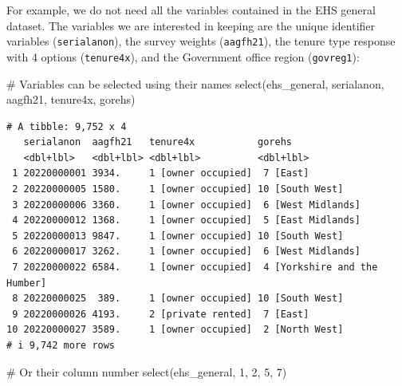 \documentclass[
  letterpaper,
  DIV=11,
  numbers=noendperiod]{scrreprt}
\newenvironment{Shaded}{\begin{snugshade}}{\end{snugshade}}
\newcommand{\CommentTok}[1]{\textcolor[rgb]{0.37,0.37,0.37}{#1}}
\newcommand{\DecValTok}[1]{\textcolor[rgb]{0.68,0.00,0.00}{#1}}
\newcommand{\FunctionTok}[1]{\textcolor[rgb]{0.28,0.35,0.67}{#1}}
\newcommand{\NormalTok}[1]{\textcolor[rgb]{0.00,0.23,0.31}{#1}}
\begin{document}
For example, we do not need all the variables contained in the EHS
general dataset. The variables we are interested in keeping are the
unique identifier variables (\texttt{serialanon}), the survey weights
(\texttt{aagfh21}), the tenure type response with 4 options
(\texttt{tenure4x}), and the Government office region
(\texttt{govreg1}):

\begin{Shaded}
\begin{Highlighting}[]
\CommentTok{\# Variables can be selected using their names}
\FunctionTok{select}\NormalTok{(ehs\_general, serialanon, aagfh21, tenure4x, gorehs)}
\end{Highlighting}
\end{Shaded}

\begin{verbatim}
# A tibble: 9,752 x 4
   serialanon  aagfh21   tenure4x           gorehs                       
   <dbl+lbl>   <dbl+lbl> <dbl+lbl>          <dbl+lbl>                    
 1 20220000001 3934.     1 [owner occupied]  7 [East]                    
 2 20220000005 1580.     1 [owner occupied] 10 [South West]              
 3 20220000006 3360.     1 [owner occupied]  6 [West Midlands]           
 4 20220000012 1368.     1 [owner occupied]  5 [East Midlands]           
 5 20220000013 9847.     1 [owner occupied] 10 [South West]              
 6 20220000017 3262.     1 [owner occupied]  6 [West Midlands]           
 7 20220000022 6584.     1 [owner occupied]  4 [Yorkshire and the Humber]
 8 20220000025  389.     1 [owner occupied] 10 [South West]              
 9 20220000026 4193.     2 [private rented]  7 [East]                    
10 20220000027 3589.     1 [owner occupied]  2 [North West]              
# i 9,742 more rows
\end{verbatim}

\begin{Shaded}
\begin{Highlighting}[]
\CommentTok{\# Or their column number}
\FunctionTok{select}\NormalTok{(ehs\_general, }\DecValTok{1}\NormalTok{, }\DecValTok{2}\NormalTok{, }\DecValTok{5}\NormalTok{, }\DecValTok{7}\NormalTok{)}
\end{Highlighting}
\end{Shaded}
\end{document}
